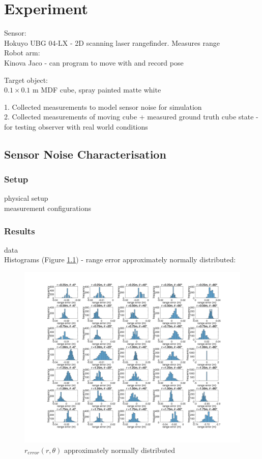 \chapter{Experiment}
Sensor:\\
Hokuyo UBG 04-LX - 2D scanning laser rangefinder. Measures range\\

Robot arm: \\
Kinova Jaco - can program to move with and record pose

Target object: \\
$0.1 \times 0.1$ m MDF cube, spray painted matte white

1. Collected measurements to model sensor noise for simulation\\
2. Collected measurements of moving cube + measured ground truth cube state - for testing observer with real world conditions

\section{Sensor Noise Characterisation}
	\subsection{Setup}
		physical setup\\
		measurement configurations 
	\subsection{Results}
		data\\
		Histograms (Figure \ref{fig:mean_hist}) - range error approximately normally distributed:
		\begin{figure}
		  \includegraphics[width=1.25\textwidth,trim = 0mm 0mm 0mm 0mm,clip]{./Figures/range_error_histograms.jpg}
		  \caption{$r_{error}(r,\theta)$ approximately normally distributed}
		  \label{fig:mean_hist}
		\end{figure}
		
